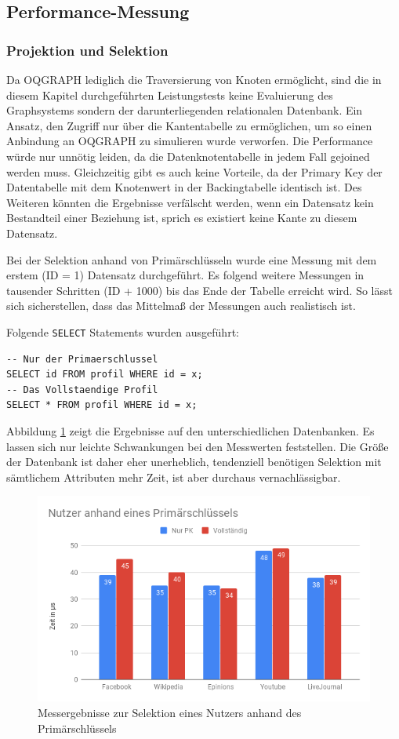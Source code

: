 \subsection{Performance-Messung}

\subsubsection{Projektion und Selektion}
Da OQGRAPH lediglich die Traversierung von Knoten ermöglicht, sind die in diesem Kapitel durchgeführten Leistungstests keine Evaluierung des Graphsystems sondern der darunterliegenden relationalen Datenbank. Ein Ansatz, den Zugriff nur über die Kantentabelle zu ermöglichen, um so einen Anbindung an OQGRAPH zu simulieren wurde verworfen. Die Performance würde  nur unnötig leiden, da die Datenknotentabelle in jedem Fall gejoined werden muss. Gleichzeitig gibt es auch keine Vorteile, da der Primary Key der Datentabelle mit dem Knotenwert in der Backingtabelle identisch ist. Des Weiteren könnten die Ergebnisse verfälscht werden, wenn ein Datensatz kein Bestandteil einer Beziehung ist, sprich es existiert keine Kante zu diesem Datensatz.

Bei der Selektion anhand von Primärschlüsseln wurde eine Messung mit dem erstem (ID = 1) Datensatz durchgeführt. Es folgend weitere Messungen in tausender Schritten (ID + 1000) bis das Ende der Tabelle erreicht wird. So lässt sich sicherstellen, dass das Mittelmaß der Messungen auch realistisch ist.

Folgende \lstinline{SELECT} Statements wurden ausgeführt:
\begin{lstlisting}
-- Nur der Primaerschlussel
SELECT id FROM profil WHERE id = x;
-- Das Vollstaendige Profil
SELECT * FROM profil WHERE id = x;
\end{lstlisting}

Abbildung \ref{fig:NutzerPk} zeigt die Ergebnisse auf den unterschiedlichen Datenbanken. Es lassen sich nur leichte Schwankungen bei den Messwerten feststellen. Die Größe der Datenbank ist daher eher unerheblich, tendenziell benötigen Selektion mit sämtlichem Attributen mehr Zeit, ist aber durchaus vernachlässigbar.
\begin{figure}[h]
	\centering
	\includegraphics[width=\textwidth]{images/NutzerPk.png}
	\caption{Messergebnisse zur Selektion eines Nutzers anhand des Primärschlüssels}
	\label{fig:NutzerPk}
\end{figure}

